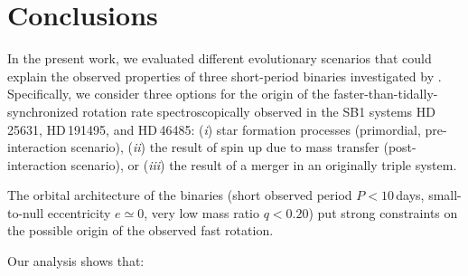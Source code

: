 \documentclass{aa}
\begin{document}
\section{Conclusions}
\label{sec:conclusions}
In the present work, we evaluated different evolutionary scenarios
that could explain the observed properties of three short-period
binaries investigated by \citet{Naze_2023_rot}. Specifically, we
  consider three options for the origin of the
  faster-than-tidally-synchronized rotation rate spectroscopically
  observed in the SB1 systems HD\,25631, HD\,191495, and HD\,46485: (\emph{i})
  star formation processes (primordial, pre-interaction scenario), (\emph{ii})
  the result of spin up due to mass transfer (post-interaction
  scenario), or (\emph{iii}) the result of a merger in an originally triple
  system.

The orbital architecture of the binaries (short observed period $P<10$\,days,
  small-to-null eccentricity $e\simeq0$, very low mass ratio $q<0.20$) put
  strong constraints on the possible origin of the observed fast rotation.


Our analysis shows that:
\end{document}
